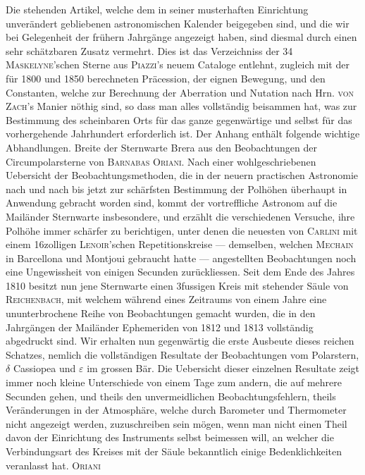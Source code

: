 Die stehenden Artikel, welche dem in seiner musterhaften Einrichtung unverändert gebliebenen
astronomischen Kalender beigegeben sind, und die wir bei Gelegenheit der frühern Jahrgänge
angezeigt haben, sind diesmal durch einen sehr schätzbaren Zusatz vermehrt. Dies ist das
Verzeichniss der 34 \textsc{Maskelyne}'schen Sterne aus \textsc{Piazzi}'s neuem Cataloge
entlehnt, zugleich mit der für 1800 und 1850 berechneten Präcession, der eignen Bewegung, und
den Constanten, welche zur Berechnung der Aberration und Nutation nach Hrn. \textsc{von Zach}'s
Manier nöthig sind, so dass man alles vollständig beisammen hat, was zur Bestimmung des
scheinbaren Orts für das ganze gegenwärtige und selbst für das vorhergehende Jahrhundert
erforderlich ist. Der Anhang enthält folgende wichtige Abhandlungen. Breite der Sternwarte Brera
aus den Beobachtungen der Circumpolarsterne von \textsc{Barnabas Oriani}. Nach einer
wohlgeschriebenen Uebersicht der Beobachtungsmethoden, die in der neuern practischen Astronomie
nach und nach bis jetzt zur schärfsten Bestimmung der Polhöhen überhaupt in Anwendung gebracht
worden sind, kommt der vortreffliche Astronom auf die Mailänder Sternwarte insbesondere, und
erzählt die verschiedenen Versuche, ihre Polhöhe immer schärfer zu berichtigen, unter denen die
neuesten von \textsc{Carlini} mit einem 16zolligen \textsc{Lenoir}'schen Repetitionskreise —
demselben, welchen \textsc{Mechain} in Barcellona und Montjoui gebraucht hatte — angestellten
Beobachtungen noch eine Ungewissheit von einigen Secunden zurückliessen. Seit dem Ende des
Jahres 1810 besitzt nun jene Sternwarte einen 3fussigen Kreis mit stehender Säule von
\textsc{Reichenbach}, mit welchem während eines Zeitraums von einem Jahre eine ununterbrochene
Reihe von Beobachtungen gemacht wurden, die in den Jahrgängen der Mailänder Ephemeriden von 1812
und 1813 vollständig abgedruckt sind. Wir erhalten nun gegenwärtig die erste Ausbeute dieses
reichen Schatzes, nemlich die vollständigen Resultate der Beobachtungen vom Polarstern, $\delta$
Cassiopea und $\varepsilon$ im grossen Bär. Die Uebersicht dieser einzelnen Resultate zeigt immer
noch kleine Unterschiede von einem Tage zum andern, die auf mehrere Secunden gehen, und theils
den unvermeidlichen Beobachtungsfehlern, theils Veränderungen in der Atmosphäre, welche durch
Barometer und Thermometer nicht angezeigt werden, zuzuschreiben sein mögen, wenn man nicht einen
Theil davon der Einrichtung des Instruments selbst beimessen will, an welcher die Verbindungsart
des Kreises mit der Säule bekanntlich einige Bedenklichkeiten veranlasst hat. \textsc{Oriani}
